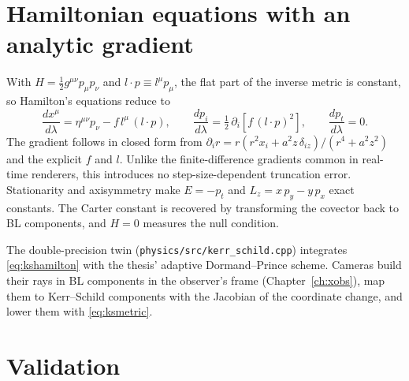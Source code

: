 \section{Hamiltonian equations with an analytic gradient}

With $H = \tfrac12 g^{\mu\nu}p_\mu p_\nu$ and $l\cdot p \equiv l^\mu p_\mu$, the
flat part of the inverse metric is constant, so Hamilton's equations reduce
to
\begin{equation}
\frac{dx^\mu}{d\lambda} = \eta^{\mu\nu}p_\nu - f\,l^\mu\,(l\cdot p),
\qquad
\frac{dp_i}{d\lambda} = \tfrac12\,\partial_i\!\left[f\,(l\cdot p)^2\right],
\qquad
\frac{dp_t}{d\lambda} = 0 .
\label{eq:kshamilton}
\end{equation}
The gradient follows in closed form from $\partial_i r = r(r^2x_i +
a^2z\,\delta_{iz})/(r^4 + a^2z^2)$ and the explicit $f$ and $l$. Unlike the
finite-difference gradients common in real-time renderers, this introduces
no step-size-dependent truncation error. Stationarity and axisymmetry make
$E = -p_t$ and $L_z = x\,p_y - y\,p_x$ exact constants. The Carter constant is
recovered by transforming the covector back to BL components, and $H = 0$
measures the null condition.

The double-precision twin (\texttt{physics/src/kerr\_schild.cpp}) integrates
\eqref{eq:kshamilton} with the thesis' adaptive Dormand--Prince scheme.
Cameras build their rays in BL components in the observer's frame
(Chapter~\ref{ch:xobs}), map them to Kerr--Schild components with the
Jacobian of the coordinate change, and lower them with \eqref{eq:ksmetric}.

\section{Validation}

